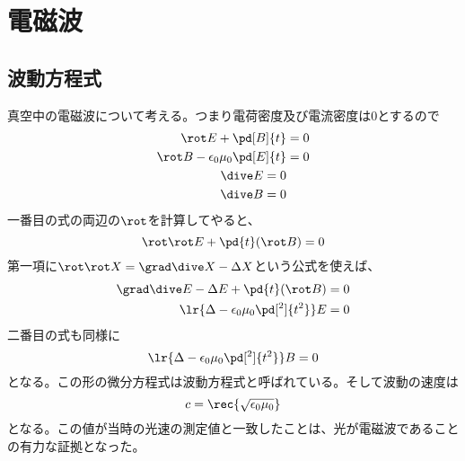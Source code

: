     \section{電磁波}
        \subsection{波動方程式}
            真空中の電磁波について考える。つまり電荷密度及び電流密度は0とするので
            \begin{align*}
                \rot E + \pd[B]{t} &= 0\\
                \rot B - \epsilon_0\mu_0\pd[E]{t} &= 0\\
                \dive E = 0\\
                \dive B = 0
            \end{align*}
            一番目の式の両辺の$\rot$を計算してやると、
                \[\rot\rot E + \pd{t}(\rot B) = 0\]
            第一項に$\rot\rot X = \grad\dive X - \Delta X$という公式を使えば、
            \begin{align*}
                \grad\dive E - \Delta E + \pd{t}(\rot B) = 0\\
                \lr{\Delta - \epsilon_0\mu_0\pd[^2]{t^2}}E = 0
            \end{align*}
            二番目の式も同様に
                \[\lr{\Delta - \epsilon_0\mu_0\pd[^2]{t^2}}B = 0\]
            となる。この形の微分方程式は波動方程式と呼ばれている。そして波動の速度は
                \[c = \rec{\sqrt{\epsilon_0\mu_0}}\]
            となる。この値が当時の光速の測定値と一致したことは、光が電磁波であることの有力な証拠となった。
